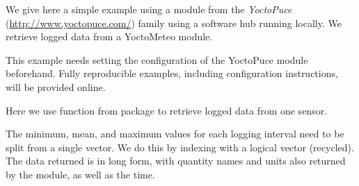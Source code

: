 \documentclass[krantz2]{krantz}\usepackage{knitr}
\newcommand{\href}[2]{\emph{#2} (\url{#1})}
\begin{document}
We give here a simple example using a module from the \href{http://www.yoctopuce.com/}{YoctoPuce} family using a software hub running locally. We retrieve logged data from a YoctoMeteo module.

\begin{infobox}
This example needs setting the configuration of the YoctoPuce module beforehand. Fully reproducible examples, including configuration instructions, will be provided online.
\end{infobox}

Here we use function  from package  to retrieve logged data from one sensor.

\begin{knitrout}\footnotesize
{}\color{fgcolor}\begin{kframe}
\begin{alltt}
 \hlkwb{<-} 
 \hlkwb{<-}
    \hlstd{(} \hlstd{,}
                    \hlstd{=} \hlstd{),}  \hlstd{=} \hlstd{)}
  \hlstd{=} \hlstd{)}
\end{alltt}
\end{kframe}
\end{knitrout}

The minimum, mean, and maximum values for each logging interval need to be split from a single vector. We do this by indexing with a logical vector (recycled). The data returned is in long form, with quantity names and units also returned by the module, as well as the time.
\end{document}
